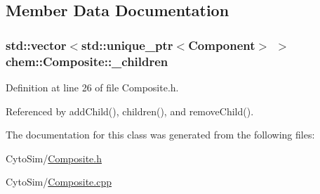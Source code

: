 \subsection{Member Data Documentation}
\hypertarget{classchem_1_1Composite_a80fea5cefad1820315fbef6f8d7adf17}{
\subsubsection[{\-\_\-children}]{\setlength{\rightskip}{0pt plus 5cm}std\-::vector$<$std\-::unique\-\_\-ptr$<${\bf Component}$>$ $>$ {\bf chem\-::\-Composite\-::\-\_\-children}}}\label{classchem_1_1Composite_a80fea5cefad1820315fbef6f8d7adf17}


Definition at line 26 of file Composite.\-h.



Referenced by add\-Child(), children(), and remove\-Child().



The documentation for this class was generated from the following files\-:\begin{DoxyCompactItemize}
\item 
Cyto\-Sim/\hyperlink{Composite_8h}{Composite.\-h}\item 
Cyto\-Sim/\hyperlink{Composite_8cpp}{Composite.\-cpp}\end{DoxyCompactItemize}
